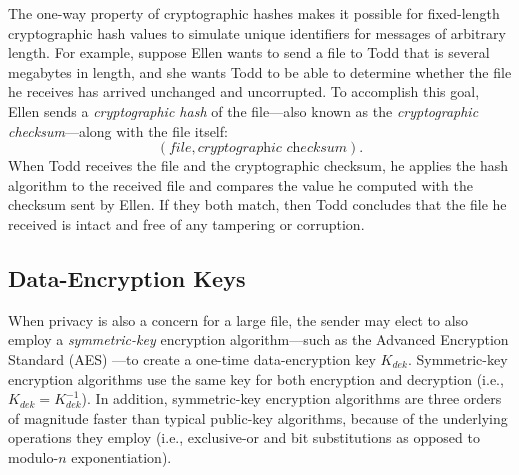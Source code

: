 The one-way property of cryptographic hashes makes it possible for
fixed-length cryptographic hash values to simulate unique identifiers
for messages of arbitrary length.  For example, suppose Ellen wants to
send a file to Todd that is several megabytes in length, and she wants
Todd to be able to determine whether the file he receives has arrived
unchanged and uncorrupted.  To accomplish this goal, Ellen sends a
\emph{cryptographic hash} of
the file---also known as the \emph{cryptographic checksum}---along with
the file itself:
\[ (\mathit{file}, \textit{cryptographic checksum}).\] When Todd receives
the file and the cryptographic checksum, he applies the hash algorithm
to the received file and compares the value he computed with the
checksum sent by Ellen.  If they both match, then Todd concludes that the
file he received is intact and free of any tampering or corruption.


\subsection{Data-Encryption Keys}
When privacy is also a concern for a large file, the sender may elect
to also employ a \emph{symmetric-key}
encryption algorithm---such as the Advanced Encryption Standard (AES)
\cite{AES}---to create a one-time data-encryption key $K_{dek}$.  Symmetric-key encryption
algorithms use the same key for both encryption and decryption (i.e.,
$K_{dek} = K^{-1}_{dek}$).  In addition, symmetric-key encryption
algorithms are three orders of magnitude faster than typical
public-key algorithms, because of the underlying operations they
employ (i.e., exclusive-or and bit substitutions as opposed to
modulo-$n$ exponentiation).


